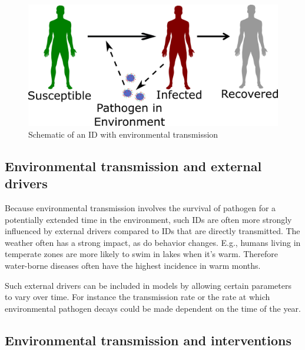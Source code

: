 \documentclass[]{book}
\theoremstyle{definition}
\theoremstyle{definition}
\theoremstyle{definition}
\theoremstyle{remark}
\begin{document}
\begin{figure}
\centering
\includegraphics{./images/environmentaltransmissionscheme.png}
\caption{Schematic of an ID with environmental transmission}
\end{figure}

\subsection{Environmental transmission and external
drivers}\label{environmental-transmission-and-external-drivers}

Because environmental transmission involves the survival of pathogen for
a potentially extended time in the environment, such IDs are often more
strongly influenced by external drivers compared to IDs that are
directly transmitted. The weather often has a strong impact, as do
behavior changes. E.g., humans living in temperate zones are more likely
to swim in lakes when it's warm. Therefore water-borne diseases often
have the highest incidence in warm months.

Such external drivers can be included in models by allowing certain
parameters to vary over time. For instance the transmission rate or the
rate at which environmental pathogen decays could be made dependent on
the time of the year.

\subsection{Environmental transmission and
interventions}\label{environmental-transmission-and-interventions}
\end{document}
